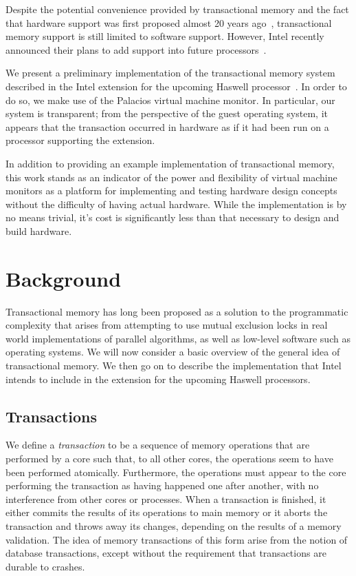 \documentclass{acm_proc_article-sp}
\begin{document}
Despite the potential convenience provided by transactional memory and the fact
that hardware support was first proposed almost 20 years ago~\cite{Herlihy:1993:TMA:173682.165164},
transactional memory support is still limited to software support. However,
Intel recently announced their plans to add support into future
processors~\cite{intelsys}.

We present a preliminary implementation of the transactional memory system
described in the Intel extension for the upcoming Haswell
processor~\cite{intelsys}.  In order to do so, we make use of the Palacios
virtual machine monitor. In particular, our system is transparent; from the
perspective of the guest operating system, it appears that the transaction
occurred in hardware as if it had been run on a processor supporting the
extension. 

In addition to providing an example implementation of transactional memory,
this work stands as an indicator of the power and flexibility of virtual
machine monitors as a platform for implementing and testing hardware design
concepts without the difficulty of having actual hardware. While the
implementation is by no means trivial, it's cost is significantly less than
that necessary to design and build hardware.  

\section{Background}

Transactional memory has long been proposed as a solution to the programmatic
complexity that arises from attempting to use mutual exclusion locks in real
world implementations of parallel algorithms, as well as low-level software such
as operating systems. We will now consider a basic
overview of the general idea of transactional memory. We then go on to describe
the implementation that Intel intends to include in the extension for the
upcoming Haswell processors.

\subsection{Transactions} 

We define a \emph{transaction} to be a sequence of memory operations that are
performed by a core such that, to all other cores, the operations
seem to have been performed atomically. Furthermore, the operations must appear
to the core  performing the transaction as having happened one after
another, with no interference from other cores or processes.  When a transaction is
finished, it either commits the results of its operations to main memory or it
aborts the transaction and throws away its changes, depending on the results of
a memory validation. The idea of memory transactions of this form arise from
the notion of database transactions, except without the requirement that
transactions are durable to crashes. 
\end{document}
